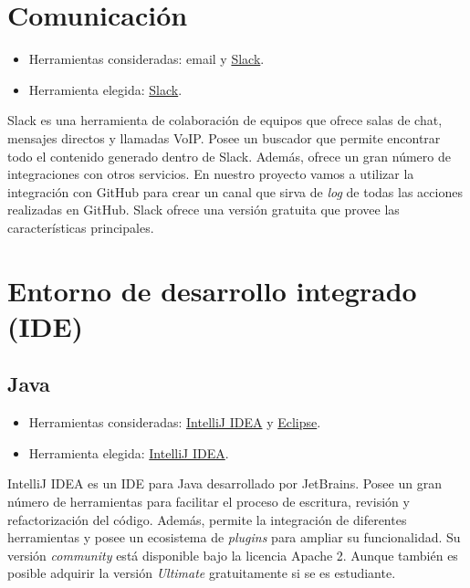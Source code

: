 \section{Comunicación}\label{comunicacion}

\begin{itemize}
\tightlist
\item
  Herramientas consideradas: email y
  \href{https://gobees.slack.com/}{Slack}.
\item
  Herramienta elegida: \href{https://gobees.slack.com/}{Slack}.
\end{itemize}

Slack es una herramienta de colaboración de equipos que ofrece salas de
chat, mensajes directos y llamadas VoIP. Posee un buscador que permite
encontrar todo el contenido generado dentro de Slack. Además, ofrece un
gran número de integraciones con otros servicios. En nuestro proyecto
vamos a utilizar la integración con GitHub para crear un canal que sirva
de \emph{log} de todas las acciones realizadas en GitHub. Slack ofrece una
versión gratuita que provee las características principales.

\section{Entorno de desarrollo integrado
(IDE)}\label{entorno-de-desarrollo-integrado-ide}

\subsection{Java}\label{java}

\begin{itemize}
\tightlist
\item
  Herramientas consideradas:
  \href{https://www.jetbrains.com/idea/}{IntelliJ IDEA} y
  \href{https://eclipse.org/}{Eclipse}.
\item
  Herramienta elegida: \href{https://www.jetbrains.com/idea/}{IntelliJ
  IDEA}.
\end{itemize}

IntelliJ IDEA es un IDE para Java desarrollado por JetBrains. Posee un
gran número de herramientas para facilitar el proceso de escritura,
revisión y refactorización del código. Además, permite la integración de
diferentes herramientas y posee un ecosistema de \emph{plugins} para
ampliar su funcionalidad. Su versión \emph{community} está disponible
bajo la licencia Apache 2. Aunque también es posible adquirir la versión
\emph{Ultimate} gratuitamente si se es estudiante.

